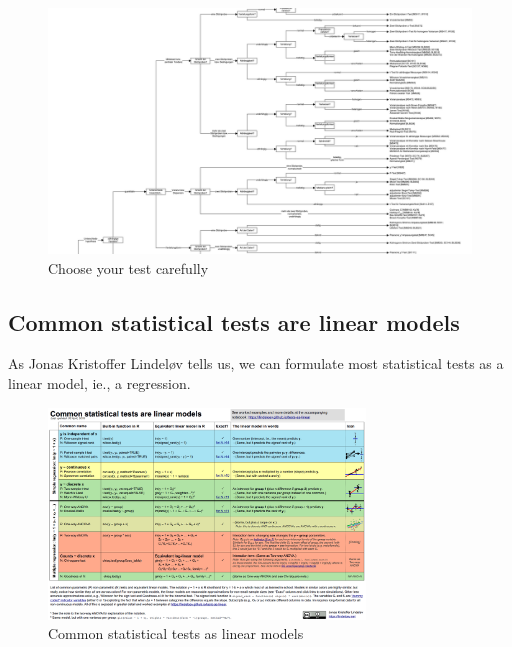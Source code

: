 \documentclass[
  letterpaper,
  DIV=11,
  numbers=noendperiod]{scrreprt}
\theoremstyle{definition}
\theoremstyle{definition}
\theoremstyle{remark}
\begin{document}
\begin{figure}

{\centering \includegraphics{./img/choose-test.png}

}

\caption{\label{fig-choose-test}Choose your test carefully}

\end{figure}

\hypertarget{common-statistical-tests-are-linear-models}{%
\subsection{Common statistical tests are linear
models}\label{common-statistical-tests-are-linear-models}}

As Jonas Kristoffer Lindeløv tells us, we can formulate most statistical
tests as a linear model, ie., a regression.

\begin{figure}

{\centering \includegraphics[width=0.75\textwidth,height=\textheight]{./img/linear_tests_cheat_sheet.png}

}

\caption{Common statistical tests as linear models}

\end{figure}
\end{document}
